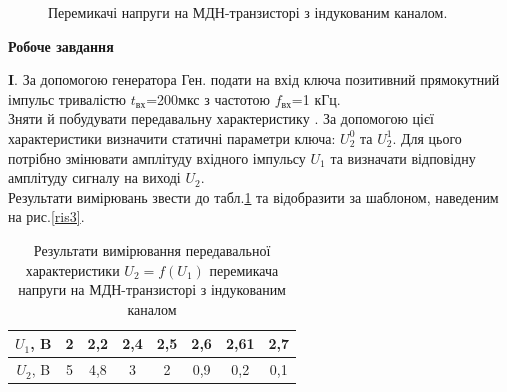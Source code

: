 \documentclass[a4paper,14pt]{extreport}
\begin{document}
\begin{figure}[h]
	\caption{Перемикачі напруги на МДН-транзисторі з індукованим каналом.}
	\label{ris5}
\end{figure}


\begin{center}
\textbf{Робоче завдання}
\end{center}

\textbf{I}. За допомогою генератора Ген. подати на вхід ключа позитивний прямокутний імпульс тривалістю $t_{\text{вх}}$=200мкс з частотою $f_{\text{вх}}$=1 кГц. \\

Зняти й побудувати передавальну характеристику . За допомогою цієї характеристики визначити статичні параметри ключа:  $U_2^0$ та $U_2^1$. Для цього потрібно змінювати амплітуду вхідного імпульсу $U_1$ та визначати відповідну амплітуду сигналу на виході $U_2$. \\

Результати вимірювань звести до табл.\ref{tab3}  та відобразити за шаблоном, наведеним на рис.\ref{ris3}.

\begin{table}[h!]
	\begin{center}
		\begin{tabular}{|c|c|c|c|c|c|c|c|}
			\hline
			$U_1$, B & 2 & 2,2 & 2,4 & 2,5 & 2,6 & 2,61 & 2,7 \\ \hline
			$U_2$, B & 5 & 4,8 & 3 & 2 & 0,9 & 0,2 & 0,1 \\ \hline
		\end{tabular}
	
		\caption{Результати вимірювання передавальної характеристики $U_2 = f(U_1)$ перемикача напруги на МДН-транзисторі з індукованим каналом}
		\label{tab3}

	\end{center}
\end{table}
\end{document}

